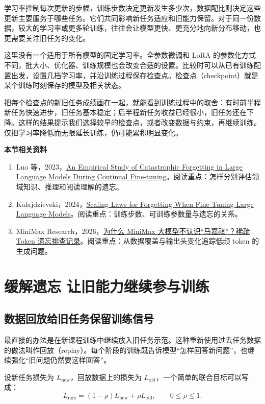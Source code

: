 学习率控制每次更新的步幅，训练步数决定更新发生多少次，数据配比则决定这些更新主要服务于哪些任务。它们共同影响新任务适应和旧能力保留。对于同一份数据，较大的学习率或更多轮训练，往往会让模型更快、更充分地向新分布移动，也更需要关注旧任务的变化。

这里没有一个适用于所有模型的固定学习率。全参数微调和 LoRA 的参数化方式不同，批大小、优化器、训练规模也会改变合适的设置。比较时可以从已有训练配置出发，设置几档学习率，并沿训练过程保存检查点。检查点（checkpoint）就是某个训练时刻保存的模型及相关状态。

把每个检查点的新旧任务成绩画在一起，就能看到训练过程中的取舍：有时前半程新任务快速进步，旧任务基本稳定；后半程新任务收益已经很小，旧任务还在下降。这样的结果提示我们选择较早的检查点，或者改变数据与约束，再继续训练。仅把学习率降低而无限延长训练，仍可能累积明显变化。

\textbf{本节相关资料}
\begin{enumerate}
    \item Luo 等，2023，\href{https://arxiv.org/abs/2308.08747}{An Empirical Study of Catastrophic Forgetting in Large Language Models During Continual Fine-tuning}。阅读重点：怎样分别评估领域知识、推理和阅读理解的遗忘。
    \item Kalajdzievski，2024，\href{https://arxiv.org/abs/2401.05605}{Scaling Laws for Forgetting When Fine-Tuning Large Language Models}。阅读重点：训练步数、可训练参数量与遗忘的关系。
    \item MiniMax Research，2026，\href{https://www.minimax.cn/blog/sparse-token-forgetting-investigation}{为什么 MiniMax 大模型不认识“马嘉祺”？稀疏 Token 遗忘排查记录}。阅读重点：从数据覆盖与输出头变化追踪低频 token 的生成问题。
\end{enumerate}

\section{缓解遗忘 让旧能力继续参与训练}\label{缓解灾难性遗忘}

\subsection{数据回放给旧任务保留训练信号}

最直接的办法是在新课程训练中继续放入旧任务示范。这种重新使用过去任务数据的做法叫作回放（replay）。每个阶段的训练既告诉模型“怎样回答新问题”，也继续强化“旧问题仍然要这样回答”。

设新任务损失为 $L_{\mathrm{new}}$，回放数据上的损失为 $L_{\mathrm{old}}$，一个简单的联合目标可以写成：
\[
L_{\mathrm{mix}}
=(1-\rho)L_{\mathrm{new}}+\rho L_{\mathrm{old}},
\qquad 0\leq\rho\leq1.
\]

